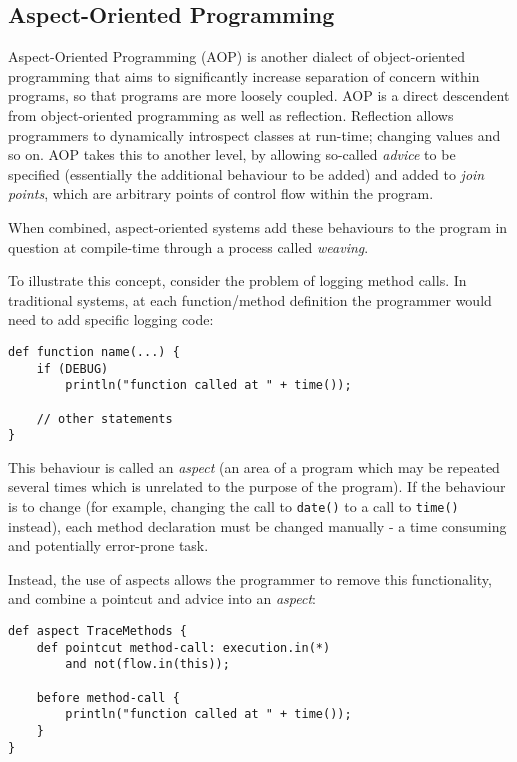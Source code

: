         \subsection{Aspect-Oriented Programming} \label{sec:instrumentation/alt-instr/aop}
        Aspect-Oriented Programming (AOP) \citep{Kiczales1997} is another dialect of object-oriented programming that aims to significantly increase separation of concern within programs, so that programs are more loosely coupled. AOP is a direct descendent from object-oriented programming as well as reflection. Reflection allows programmers to dynamically introspect classes at run-time; changing values and so on. AOP takes this to another level, by allowing so-called \textit{advice} to be specified (essentially the additional behaviour to be added) and added to \textit{join points}, which are arbitrary points of control flow within the program.

        When combined, aspect-oriented systems add these behaviours to the program in question at compile-time through a process called \textit{weaving}.

        To illustrate this concept, consider the problem of logging method calls. In traditional systems, at each function/method definition the programmer would need to add specific logging code:

        \begin{lstlisting}[caption=Traditional use of advice in programs,label=lst:tradadvice]
def function name(...) {
    if (DEBUG)
        println("function called at " + time());

    // other statements
}\end{lstlisting}

        This behaviour is called an \textit{aspect} (an area of a program which may be repeated several times which is unrelated to the purpose of the program). If the behaviour is to change (\eg for example, changing the call to \texttt{date()} to a call to \texttt{time()} instead), each method declaration must be changed manually - a time consuming and potentially error-prone task.

        Instead, the use of aspects allows the programmer to remove this functionality, and combine a pointcut and advice into an \textit{aspect}:

        \begin{lstlisting}[caption=AOP-based advice equivalent to listing \ref{lst:tradadvice},label=lst:aopadvice]
def aspect TraceMethods {
    def pointcut method-call: execution.in(*)
        and not(flow.in(this));

    before method-call {
        println("function called at " + time());
    }
}\end{lstlisting}

